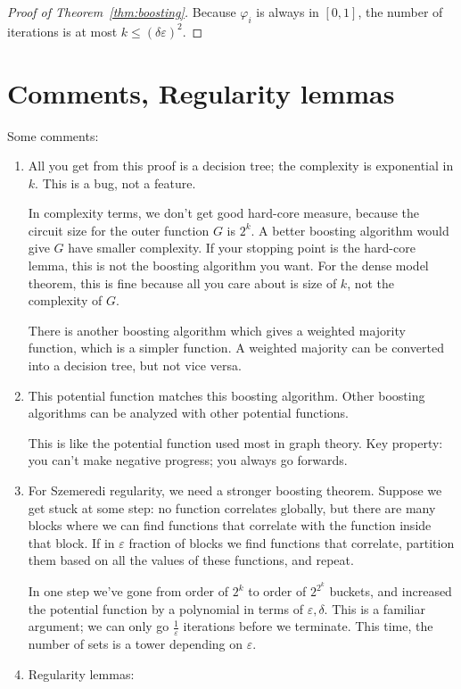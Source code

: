 \begin{proof}[Proof of Theorem~\ref{thm:boosting}]
Because $\varphi_i$ is always in $[0,1]$, the number of iterations is at most $k\le (\delta \varepsilon)^2$.
\end{proof}

\section{Comments, Regularity lemmas}

Some comments:

\begin{enumerate}
\item
All you get from this proof is a decision tree; the complexity is exponential in $k$. This is a bug, not a feature.

In complexity terms, we don't get good hard-core measure, because the circuit size for the outer function $G$ is $2^k$.
A better boosting algorithm would give $G$ have smaller complexity. If your stopping point is the hard-core lemma, this is not the boosting algorithm you want. For the dense model theorem, this is fine because all you care about is size of $k$, not the  complexity of $G$.

There is another boosting algorithm which gives a weighted majority function, which is a simpler function. A weighted majority can be converted into a decision tree, but not vice versa.
\item
This potential function matches this boosting algorithm. Other boosting algorithms can be analyzed with other potential functions. 

This is like the potential function used most in graph theory. Key property: you can't make negative progress; you always go forwards.
\item 
For Szemeredi regularity, we need a stronger boosting theorem. Suppose we get stuck at some step: no function correlates globally, but there are many blocks where we can find functions that correlate with the function inside that block. If in $\varepsilon$ fraction of blocks we find functions that correlate, partition them based on all the values of these functions, and repeat.

In one step we've gone from order of $2^k$ to order of $2^{2^k}$ buckets, and increased the potential function by a polynomial in terms of $\varepsilon,\delta$. This is a familiar argument; we can only go $\frac{1}{\varepsilon}$ iterations before we terminate. This time, the number of sets is a tower depending on $\varepsilon$.
\item
Regularity lemmas: 


\end{enumerate}
